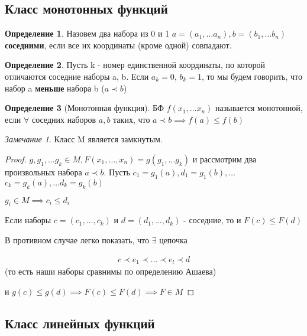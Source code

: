 \documentclass[a4paper]{article}
\theoremstyle{definition}
\newtheorem*{definition}{Определение}
\theoremstyle{remark}
\newtheorem*{remark}{Замечание}
\begin{document}
    \subsection{Класс монотонных функций}
    \begin{definition}
        Назовем два набора из 0 и 1 $a = (a_1, \dots a_n), b = (b_1, \dots b_n)$
        \textbf{соседними}, если все их координаты (кроме одной) совпадают.
    \end{definition}
    \begin{definition}
        Пусть k - номер единственной координаты, по которой отличаются соседние наборы a, b.
        Если $a_k = 0$, $b_k = 1$, то мы будем говорить, что набор a \textbf{меньше} набора b
        ($a\prec b$)
    \end{definition}
    \begin{definition}[Монотонная функция]
        БФ $f(x_1, \dots x_n)$ называется монотонной, если
        $\forall$ соседних наборов $a,b$ таких, что $a\prec b\implies f(a) \leq f(b)$
    \end{definition}
    \begin{remark}
        Класс M является замкнутым.
    \end{remark}
    \begin{proof}
        $g, g_1, \dots g_k \in M, F(x_1, \dots, x_n) = g(g_1, \dots g_k)$
        и рассмотрим два произвольных набора $a\prec b$. Пусть $c_1 = g_1(a), d_1 = g_1(b), \dots$
        $c_k = g_k(a), \dots d_k = g_k(b)$

        $g_i \in M \implies c_i\leq d_i $

        Если наборы $c = (c_1, \dots, c_k)$ и $d = (d_1, \dots, d_k)$ - соседние,
        то и $F(c)\leq F(d)$

        В противном случае легко показать, что $\exists$ цепочка

        \begin{align*}
            c \prec e_1 \prec\dots\prec e_l \prec d
        \end{align*}
        (то есть наши наборы сравнимы по определению Ашаева)
        
        и $g(c) \leq g(d)\implies F(c) \leq F(d) \implies F\in M$
    \end{proof}
    \subsection{Класс линейных функций}
\end{document}
